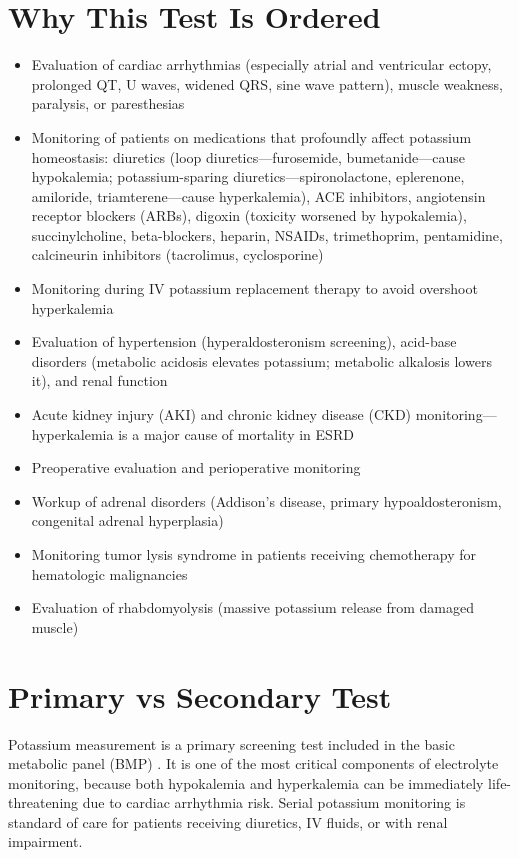 \section*{Why This Test Is Ordered}
\begin{itemize}
  \item Evaluation of cardiac arrhythmias (especially atrial and ventricular ectopy, prolonged QT, U waves, widened QRS, sine wave pattern), muscle weakness, paralysis, or paresthesias
  \item Monitoring of patients on medications that profoundly affect potassium homeostasis: diuretics (loop diuretics---furosemide, bumetanide---cause hypokalemia; potassium-sparing diuretics---spironolactone, eplerenone, amiloride, triamterene---cause hyperkalemia), ACE inhibitors, angiotensin receptor blockers (ARBs), digoxin (toxicity worsened by hypokalemia), succinylcholine, beta-blockers, heparin, NSAIDs, trimethoprim, pentamidine, calcineurin inhibitors (tacrolimus, cyclosporine)
  \item Monitoring during IV potassium replacement therapy to avoid overshoot hyperkalemia
  \item Evaluation of hypertension (hyperaldosteronism screening), acid-base disorders (metabolic acidosis elevates potassium; metabolic alkalosis lowers it), and renal function
  \item Acute kidney injury (AKI) and chronic kidney disease (CKD) monitoring---hyperkalemia is a major cause of mortality in ESRD
  \item Preoperative evaluation and perioperative monitoring
  \item Workup of adrenal disorders (Addison's disease, primary hypoaldosteronism, congenital adrenal hyperplasia)
  \item Monitoring tumor lysis syndrome in patients receiving chemotherapy for hematologic malignancies
  \item Evaluation of rhabdomyolysis (massive potassium release from damaged muscle)
\end{itemize}

\section*{Primary vs Secondary Test}
Potassium measurement is a primary screening test included in the basic metabolic panel (BMP) \cite{tierney2023current}. It is one of the most critical components of electrolyte monitoring, because both hypokalemia and hyperkalemia can be immediately life-threatening due to cardiac arrhythmia risk. Serial potassium monitoring is standard of care for patients receiving diuretics, IV fluids, or with renal impairment.

